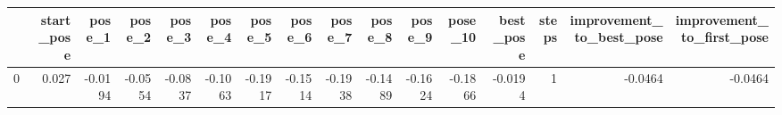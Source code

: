 \begin{tabular}{lrrrrrrrrrrrrrrr}
\toprule
{} &  start\_pose &  pose\_1 &  pose\_2 &  pose\_3 &  pose\_4 &  pose\_5 &  pose\_6 &  pose\_7 &  pose\_8 &  pose\_9 &  pose\_10 &  best\_pose &  steps &  improvement\_to\_best\_pose &  improvement\_to\_first\_pose \\
\midrule
0 &       0.027 & -0.0194 & -0.0554 & -0.0837 & -0.1063 & -0.1917 & -0.1514 & -0.1938 & -0.1489 & -0.1624 &  -0.1866 &    -0.0194 &      1 &                   -0.0464 &                    -0.0464 \\
\bottomrule
\end{tabular}
